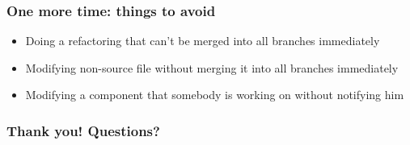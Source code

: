 \documentclass{beamer}
\begin{document}
\begin{frame}
\frametitle{One more time: things to avoid}
\begin{itemize}
\item Doing a refactoring that can't be merged into all branches immediately
\item Modifying non-source file without merging it into all branches immediately
\item Modifying a component that somebody is working on without notifying him 
\end{itemize}
\end{frame}


\begin{frame}
\frametitle{Thank you! Questions?}
\begin{center}
\end{center}
\end{frame}
\end{document}
